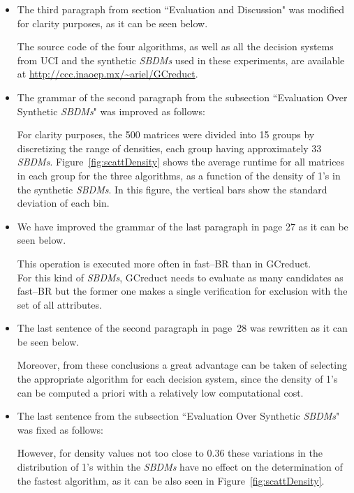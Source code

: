 \documentclass{letter}
\begin{document}
\begin{letter}{}
\begin{enumerate}
\begin{itemize}
		\item The third paragraph from section ``Evaluation and Discussion" was modified for clarity purposes, as it can be seen below.
		
		The source code of the four algorithms, as well as all the decision systems from UCI and the synthetic \textit{SBDMs} used in these experiments, are available at \url{http://ccc.inaoep.mx/~ariel/GCreduct}.
		
		\item The grammar of the second paragraph from the subsection ``Evaluation Over Synthetic \textit{SBDMs}" was improved as follows:
		
		For clarity purposes, the 500 matrices were divided into 15 groups by discretizing the range of densities, each group having approximately 33 \textit{SBDMs}. Figure~\ref{fig:scattDensity} shows the average runtime for all  matrices in each group for the three algorithms, as a function of the density of 1's in the synthetic \textit{SBDMs}. In this figure, the vertical bars show the standard deviation of each bin. 
		
		\item We have improved the grammar of the last paragraph in page 27 as it can be seen below.
		
		This operation is executed more often in fast--BR than in GCreduct.\\
		
		For this kind of \textit{SBDMs}, GCreduct needs to evaluate as many candidates as fast--BR but the former one makes a single verification for exclusion with the set of all attributes.
		
		\item The last sentence of the second paragraph in page~28 was rewritten as it can be seen below.
		
		Moreover, from these conclusions a great advantage can be taken of selecting the appropriate algorithm for each decision system, since the density of 1's can be computed a priori with a relatively low computational cost.
		
		\item The last sentence from the subsection ``Evaluation Over Synthetic \textit{SBDMs}" was fixed as follows:
		
		However, for density values not too close to 0.36 these variations in the distribution of 1's within the \textit{SBDMs} have no effect on the determination of the fastest algorithm, as it can be also seen in Figure~\ref{fig:scattDensity}.
		

\end{itemize}
\end{enumerate}
\end{letter}
\end{document}
